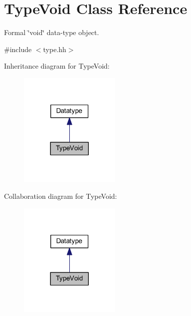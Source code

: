 \hypertarget{class_type_void}{}\section{Type\+Void Class Reference}
\label{class_type_void}


Formal \char`\"{}void\char`\"{} data-\/type object.  




{\ttfamily \#include $<$type.\+hh$>$}



Inheritance diagram for Type\+Void\+:
\nopagebreak
\begin{figure}[H]
\begin{center}
\leavevmode
\includegraphics[width=137pt]{class_type_void__inherit__graph}
\end{center}
\end{figure}


Collaboration diagram for Type\+Void\+:
\nopagebreak
\begin{figure}[H]
\begin{center}
\leavevmode
\includegraphics[width=137pt]{class_type_void__coll__graph}
\end{center}
\end{figure}
